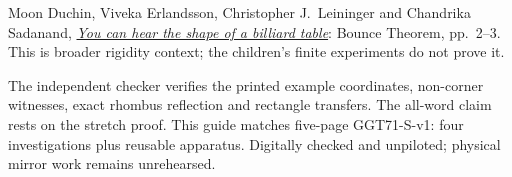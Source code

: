 \documentclass[11pt,letterpaper]{article}
\begin{document}
Moon Duchin, Viveka Erlandsson, Christopher J.~Leininger and Chandrika Sadanand, \href{https://arxiv.org/pdf/1804.05690}{\emph{You can hear the shape of a billiard table}}: Bounce Theorem, pp.~2--3. This is broader rigidity context; the children's finite experiments do not prove it.

The independent checker verifies the printed example coordinates, non-corner witnesses, exact rhombus reflection and rectangle transfers. The all-word claim rests on the stretch proof. This guide matches five-page GGT71-S-v1: four investigations plus reusable apparatus. Digitally checked and unpiloted; physical mirror work remains unrehearsed.
\end{document}
